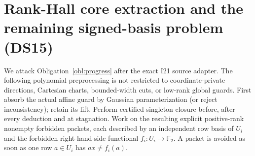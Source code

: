 \documentclass[11pt]{article}
\begin{document}
\section{Rank-Hall core extraction and the remaining signed-basis problem (DS15)}\label{sec:ds15}
We attack Obligation~\ref{obl:progress} after the exact I21 source adapter. The following polynomial preprocessing is not restricted to coordinate-private directions, Cartesian charts, bounded-width cuts, or low-rank global guards. First absorb the actual affine guard by Gaussian parameterization (or reject inconsistency); retain its lift. Perform certified singleton closure before, after every deduction and at stagnation. Work on the resulting explicit positive-rank nonempty forbidden packets, each described by an independent row basis of $U_i$ and the forbidden right-hand-side functional $f_i:U_i\to\mathbb F_2$. A packet is avoided as soon as one row $a\in U_i$ has $a x\ne f_i(a)$.
\end{document}
